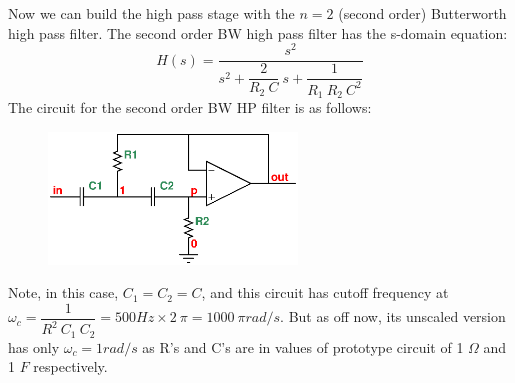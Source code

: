 \documentclass[a4paper]{IEEEtran}
\newcommand{\inv}[1]{\dfrac{1}{#1}}
\begin{document}
				Now we can build the high pass stage with the $n=2$ (second order) Butterworth high pass filter. The second order BW high pass filter has the s-domain equation:
				\begin{equation}
					\label{spec:bw:hp:n2}
					H(s)=\dfrac{s^2}{s^2+\dfrac{2}{R_2~C}~s+\inv{R_1~R_2~C^2}}
				\end{equation}
				The circuit for the second order BW HP filter is as follows:
				\begin{figure}[h!]
					\begin{center}
						\includegraphics[width=250px]{hp.eps}
					\end{center}
				\end{figure}
				
				Note, in this case, $C_1=C_2=C$, and this circuit has cutoff frequency at $\omega_c = \inv{R^2~C_1~C_2} = 500 Hz \times 2~\pi = 1000~\pi rad/s$. But as off now, its unscaled version has only $\omega_c = 1 rad/s$ as R's and C's are in values of prototype circuit of 1 $\Omega$ and 1 $F$ respectively.
				
\end{document}
